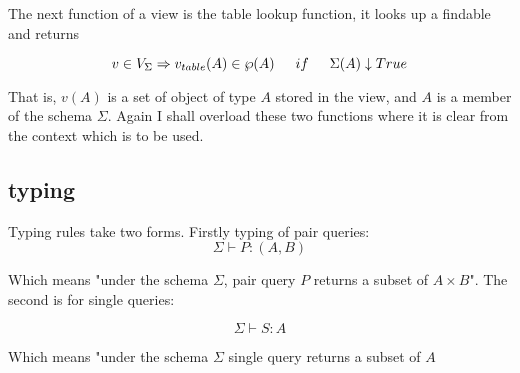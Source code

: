 \documentclass[twoside,a4paper,11pt]{article}
\begin{document}
The next function of a view is the table lookup function, it looks up a findable and returns

$$v \in V_\Sigma \Rightarrow v_{table}(A) \in \wp(A)\indent if\indent \Sigma(A)\downarrow True$$

That is, $v(A)$ is a set of object of type $A$ stored in the view, and $A$ is a member of the schema $\Sigma$. Again I shall overload these two functions where it is clear from the context which is to be used.

\subsection{typing}

Typing rules take two forms. Firstly typing of pair queries:
$$ \Sigma \vdash P\colon (A, B)$$

Which means "under the schema $\Sigma$, pair query $P$ returns a subset of $A \times B$".  The second is for single queries:

$$ \Sigma \vdash S\colon A$$

Which means "under the schema $\Sigma$ single query returns a subset of $A$
\end{document}
